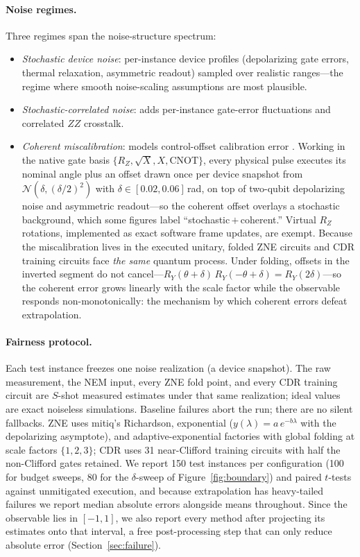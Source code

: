 \documentclass[11pt]{article}
\begin{document}
\paragraph{Noise regimes.}
Three regimes span the noise-structure spectrum:
\begin{itemize}
\item \emph{Stochastic device noise}: per-instance device profiles (depolarizing gate errors, thermal relaxation, asymmetric readout) sampled over realistic ranges---the regime where smooth noise-scaling assumptions are most plausible.
\item \emph{Stochastic-correlated noise}: adds per-instance gate-error fluctuations and correlated $ZZ$ crosstalk.
\item \emph{Coherent miscalibration}: models control-offset calibration error \citep{krantz2019engineer}. Working in the native gate basis $\{R_Z,\sqrt{X},X,\mathrm{CNOT}\}$, every physical pulse executes its nominal angle plus an offset drawn once per device snapshot from $\mathcal{N}(\delta,(\delta/2)^2)$ with $\delta\in[0.02,0.06]$\,rad, on top of two-qubit depolarizing noise and asymmetric readout---so the coherent offset overlays a stochastic background, which some figures label ``stochastic\,$+$\,coherent.'' Virtual $R_Z$ rotations, implemented as exact software frame updates, are exempt. Because the miscalibration lives in the executed unitary, folded ZNE circuits and CDR training circuits face \emph{the same} quantum process. Under folding, offsets in the inverted segment do not cancel---$R_Y(\theta{+}\delta)\,R_Y(-\theta{+}\delta)=R_Y(2\delta)$---so the coherent error grows linearly with the scale factor while the observable responds non-monotonically: the mechanism by which coherent errors defeat extrapolation.
\end{itemize}

\paragraph{Fairness protocol.}
Each test instance freezes one noise realization (a device snapshot). The raw measurement, the NEM input, every ZNE fold point, and every CDR training circuit are $S$-shot measured estimates under that same realization; ideal values are exact noiseless simulations. Baseline failures abort the run; there are no silent fallbacks. ZNE uses mitiq's Richardson, exponential ($y(\lambda)=a\,e^{-b\lambda}$ with the depolarizing asymptote), and adaptive-exponential factories with global folding at scale factors $\{1,2,3\}$; CDR uses 31 near-Clifford training circuits with half the non-Clifford gates retained. We report 150 test instances per configuration (100 for budget sweeps, 80 for the $\delta$-sweep of Figure~\ref{fig:boundary}) and paired $t$-tests against unmitigated execution, and because extrapolation has heavy-tailed failures we report median absolute errors alongside means throughout. Since the observable lies in $[-1,1]$, we also report every method after projecting its estimates onto that interval, a free post-processing step that can only reduce absolute error (Section~\ref{sec:failure}).
\end{document}
